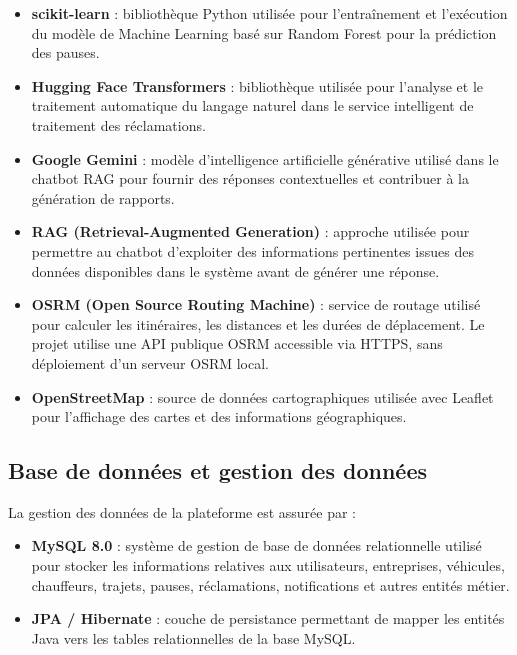 \documentclass[12pt,a4paper]{report}
\begin{document}
\begin{itemize}
    \item \textbf{scikit-learn} : bibliothèque Python utilisée pour
    l'entraînement et l'exécution du modèle de Machine Learning basé sur
    Random Forest pour la prédiction des pauses.

    \item \textbf{Hugging Face Transformers} : bibliothèque utilisée pour
    l'analyse et le traitement automatique du langage naturel dans le service
    intelligent de traitement des réclamations.

    \item \textbf{Google Gemini} : modèle d'intelligence artificielle
    générative utilisé dans le chatbot RAG pour fournir des réponses
    contextuelles et contribuer à la génération de rapports.

    \item \textbf{RAG (Retrieval-Augmented Generation)} : approche utilisée
    pour permettre au chatbot d'exploiter des informations pertinentes issues
    des données disponibles dans le système avant de générer une réponse.

    \item \textbf{OSRM (Open Source Routing Machine)} : service de routage
    utilisé pour calculer les itinéraires, les distances et les durées de
    déplacement. Le projet utilise une API publique OSRM accessible via
    HTTPS, sans déploiement d'un serveur OSRM local.

    \item \textbf{OpenStreetMap} : source de données cartographiques utilisée
    avec Leaflet pour l'affichage des cartes et des informations
    géographiques.
\end{itemize}

\subsection{Base de données et gestion des données}

La gestion des données de la plateforme est assurée par :

\begin{itemize}
    \item \textbf{MySQL 8.0} : système de gestion de base de données
    relationnelle utilisé pour stocker les informations relatives aux
    utilisateurs, entreprises, véhicules, chauffeurs, trajets, pauses,
    réclamations, notifications et autres entités métier.

    \item \textbf{JPA / Hibernate} : couche de persistance permettant de
    mapper les entités Java vers les tables relationnelles de la base MySQL.
\end{itemize}
\end{document}
